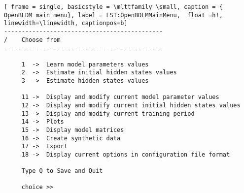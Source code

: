 \begin{lstlisting}[ frame = single, basicstyle = \mlttfamily \small, caption = { OpenBLDM main menu}, label = LST:OpenBDLMMainMenu,  float =h!, linewidth=\linewidth, captionpos=b]
---------------------------------------------
/    Choose from 
--------------------------------------------- 

     1  ->  Learn model parameters values 
     2  ->  Estimate initial hidden states values 
     3  ->  Estimate hidden states values 

     11 ->  Display and modify current model parameter values 
     12 ->  Display and modify current initial hidden states values 
     13 ->  Display and modify current training period 
     14 ->  Plots 
     15 ->  Display model matrices 
     16 ->  Create synthetic data 
     17 ->  Export
     18 ->  Display current options in configuration file format 

     Type Q to Save and Quit 

     choice >> 
\end{lstlisting}